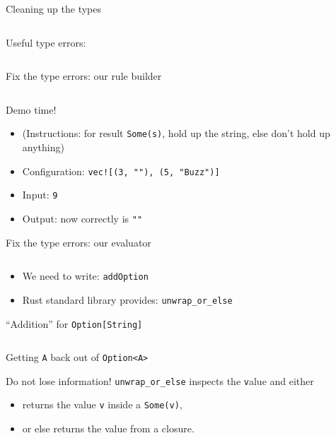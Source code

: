 \begin{frame}[fragile]{Cleaning up the types}
  \inputminted{rust}{FizzBuzz6.rs}

  Useful type errors:

  \inputminted{console}{testQuick10.console}
\end{frame}

\begin{frame}[fragile]{Fix the type errors: our rule builder}
  \inputminted{rust}{FizzBuzz7Rule.rs}

  \begin{block}{Demo time!}
    \begin{itemize}
    \item (Instructions: for result \texttt{Some(s)}, hold up the string, else don't hold up anything)
    \item Configuration: \texttt{vec![(3, ""), (5, "Buzz")]}
    \item Input: \texttt{9}
    \item Output: now correctly is \texttt{""}
    \end{itemize}
  \end{block}
\end{frame}

\begin{frame}[fragile]{Fix the type errors: our evaluator}
  \inputminted{rust}{FizzBuzz7.rs}

  \begin{itemize}
  \item We need to write: \texttt{addOption}
  \item Rust standard library provides: \texttt{unwrap_or_else}
  \end{itemize}
\end{frame}

\begin{frame}[fragile]{``Addition'' for \texttt{Option[String]}}
  \inputminted{rust}{FizzBuzz8.rs}
\end{frame}

\begin{frame}[fragile]{Getting \texttt{A} back out of \texttt{Option<A>}}
  \begin{block}{Do not lose information!}
    \texttt{unwrap_or_else} inspects the \texttt value and either
    \begin{itemize}
    \item returns the value \texttt{v} inside a \texttt{Some(v)},
    \item or else returns the value from a closure.
    \end{itemize}
  \end{block}
\end{frame}

